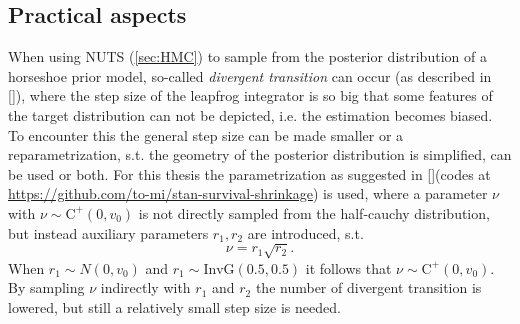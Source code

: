 \documentclass[12pt,letterpaper]{article}
\numberwithin{equation}{subsection}
\begin{document}
\subsection{Practical aspects}
\label{sec:pract}
When using NUTS (\ref{sec:HMC}) to sample from the posterior distribution of a horseshoe prior model, so-called \textit{divergent transition} can occur (as described in [\cite{paramprob}]), where the step size of the leapfrog integrator is so big that some features of the target distribution can not be depicted, i.e. the estimation becomes biased. To encounter this the general step size can be made smaller or a reparametrization, s.t. the geometry of the posterior distribution is simplified, can be used or both. For this thesis the parametrization as suggested in
[\cite{reparam}](codes at \url{https://github.com/to-mi/stan-survival-shrinkage}) is used, where a parameter $\nu$ with $\nu \sim \text{C}^+(0,v_0)$ is not directly sampled from the half-cauchy distribution, but instead auxiliary parameters $r_1,r_2$ are introduced, s.t. \begin{equation}
\nu = r_1 \sqrt{r_2}.
\end{equation}
When $r_1 \sim N(0,v_0)$ and $r_1 \sim \text{InvG}(0.5,0.5)$ it follows that $\nu \sim \text{C}^+(0,v_0)$. By sampling $\nu$ indirectly with $r_1$ and $r_2$ the number of divergent transition is lowered, but still a relatively small step size is needed. \\

\pagebreak
\end{document}
